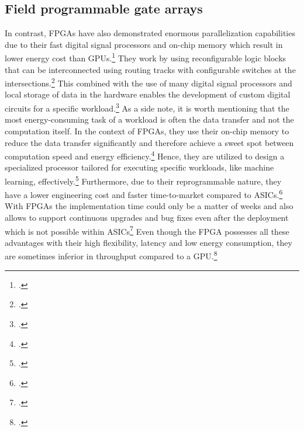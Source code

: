 \subsection{Field programmable gate arrays}
In contrast, \ac{FPGA}s have also demonstrated enormous parallelization capabilities due to their fast digital signal processors and on-chip
memory which result in lower energy cost than GPUs.\footcite[cf.][2693]{ahmadOptimizingHardwareAccelerated2020}
They work by using reconfigurable logic blocks that can be interconnected using routing tracks with configurable switches at the intersections.\footcite[cf.][144]{babuReconfigurableFPGAArchitectures2021}
This combined with the use of many digital signal processors and local storage of data in the hardware enables the development of custom digital circuits for a specific workload.\footcite[cf.][19]{baischerLearningHardwareTutorial2021}
As a side note, it is worth mentioning that the most energy-consuming task of a workload is often the data transfer and not the computation itself.
In the context of \ac{FPGA}s, they use their on-chip memory to reduce the data transfer significantly and therefore achieve a sweet spot between computation speed and energy efficiency.\footcite[cf.][101-102]{huSurveyConvolutionalNeural2022}
Hence, they are utilized to design a specialized processor tailored for executing specific workloads, like machine learning, effectively.\footcite[cf.][322]{sipolaArtificialIntelligenceIoT2022}
Furthermore, due to their reprogrammable nature, they have a lower engineering cost and faster time-to-market compared to \ac{ASIC}s.\footcite[cf.][4]{boutrosFPGAArchitecturePrinciples2021}
With \ac{FPGA}s the implementation time could only be a matter of weeks and also allows to support continuous upgrades and bug fixes even after the deployment which is not possible within \ac{ASIC}s\footcite[cf.][4]{boutrosFPGAArchitecturePrinciples2021}
Even though the \ac{FPGA} possesses all these advantages with their high flexibility, latency and low energy consumption, they are sometimes inferior in throughput compared to a \ac{GPU}.\footcite[cf.][100]{huSurveyConvolutionalNeural2022}

